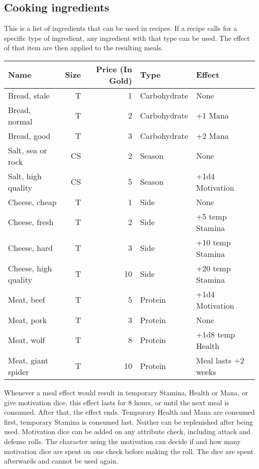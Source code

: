 \subsection{Cooking ingredients}\label{subsec:cookingIngredients}
This is a list of ingredients that can be used in recipes.
If a recipe calls for a specific type of ingredient, any ingredient with that type can be used.
The effect of that item are then applied to the resulting meals.
\begin{longtable}{l | r | r | l | p{3cm} }
	Name & Size & Price (In Gold) & Type & Effect\\ \hline
	Bread, stale & T & 1 & Carbohydrate & None\\
	Bread, normal & T & 2 & Carbohydrate & +1 Mana\\
	Bread, good & T & 3 & Carbohydrate & +2 Mana\\
	Salt, sea or rock & CS & 2 & Season & None\\
	Salt, high quality & CS & 5 & Season & +1d4 Motivation\\
	Cheese, cheap & T & 1 & Side & None\\
	Cheese, fresh & T & 2 & Side & +5 temp Stamina\\
	Cheese, hard & T & 3 & Side & +10 temp Stamina\\
	Cheese, high quality & T & 10 & Side & +20 temp Stamina\\
	Meat, beef & T & 5 & Protein & +1d4 Motivation\\
	Meat, pork & T & 3 & Protein & None \\
	Meat, wolf & T & 8 & Protein & +1d8 temp Health\\
	Meat, giant spider & T & 10 & Protein & Meal lasts +2 weeks\\
\end{longtable}

Whenever a meal effect would result in temporary Stamina, Health or Mana, or give motivation dice, this effect lasts for 8 hours, or until the next meal is consumed.
After that, the effect ends.
Temporary Health and Mana are consumed first, temporary Stamina is consumed last.
Neither can be replenished after being used.
Motivation dice can be added on any attribute check, including attack and defense rolls.
The character using the motivation can decide if and how many motivation dice are spent on one check before making the roll.
The dice are spent afterwards and cannot be used again.\\


